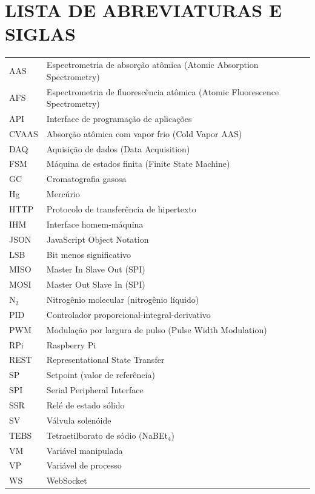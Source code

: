 \documentclass[12pt,a4paper,openright,oneside]{memoir}
\newcommand{\daq}{DAQ}
\newcommand{\ihm}{IHM}
\newcommand{\pid}{PID}
\numberwithin{equation}{chapter}
\begin{document}
\chapter*{LISTA DE ABREVIATURAS E SIGLAS}
\begin{tabular}{@{}p{3.6cm}p{11.6cm}@{}}
AAS   & Espectrometria de absorção atômica (Atomic Absorption Spectrometry)\\
AFS   & Espectrometria de fluorescência atômica (Atomic Fluorescence Spectrometry)\\
API   & Interface de programação de aplicações\\
CVAAS & Absorção atômica com vapor frio (Cold Vapor AAS)\\
\daq{}   & Aquisição de dados (Data Acquisition)\\
FSM   & Máquina de estados finita (Finite State Machine)\\
GC    & Cromatografia gasosa\\
Hg    & Mercúrio\\
HTTP  & Protocolo de transferência de hipertexto\\
\ihm{}   & Interface homem-máquina\\
JSON  & JavaScript Object Notation\\
LSB   & Bit menos significativo\\
MISO  & Master In Slave Out (SPI)\\
MOSI  & Master Out Slave In (SPI)\\
N$_2$  & Nitrogênio molecular (nitrogênio líquido)\\
\pid{}   & Controlador proporcional-integral-derivativo\\
PWM   & Modulação por largura de pulso (Pulse Width Modulation)\\
RPi   & Raspberry Pi\\
REST  & Representational State Transfer\\
SP    & Setpoint (valor de referência)\\
SPI   & Serial Peripheral Interface\\
SSR   & Relé de estado sólido\\
SV    & Válvula solenóide\\
TEBS  & Tetraetilborato de sódio (NaBEt$_4$)\\
VM    & Variável manipulada\\
VP    & Variável de processo\\
WS    & WebSocket\\
\end{tabular}
\clearpage
\end{document}
